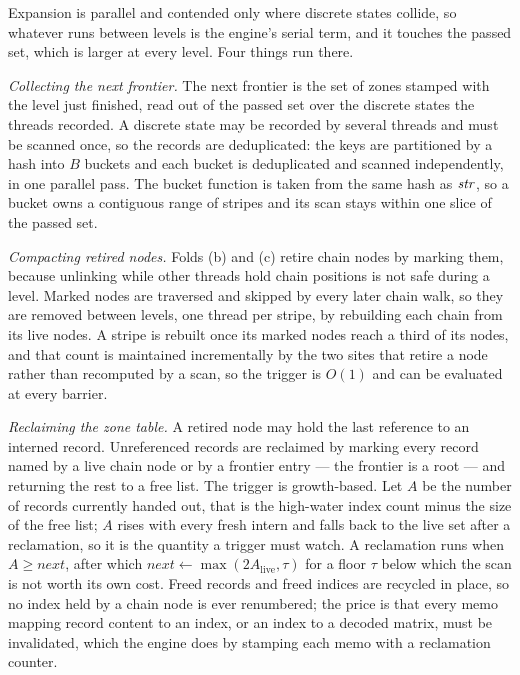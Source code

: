 Expansion is parallel and contended only where discrete states collide, so
whatever runs between levels is the engine's serial term, and it touches the
passed set, which is larger at every level.  Four things run there.

\emph{Collecting the next frontier.}  The next frontier is the set of zones
stamped with the level just finished, read out of the passed set over the
discrete states the threads recorded.  A discrete state may be recorded by
several threads and must be scanned once, so the records are deduplicated: the
keys are partitioned by a hash into $B$ buckets and each bucket is deduplicated
and scanned independently, in one parallel pass.  The bucket function is taken
from the same hash as $\mathit{str}$, so a bucket owns a contiguous range of stripes
and its scan stays within one slice of the passed set.

\emph{Compacting retired nodes.}  Folds (b) and (c) retire chain nodes by marking
them, because unlinking while other threads hold chain positions is not safe
during a level.  Marked nodes are traversed and skipped by every later chain walk,
so they are removed between levels, one thread per stripe, by rebuilding each
chain from its live nodes.  A stripe is rebuilt once its marked nodes reach a
third of its nodes, and that count is maintained incrementally by the two sites
that retire a node rather than recomputed by a scan, so the trigger is $O(1)$ and
can be evaluated at every barrier.

\emph{Reclaiming the zone table.}  A retired node may hold the last reference to
an interned record.  Unreferenced records are reclaimed by marking every record
named by a live chain node or by a frontier entry --- the frontier is a root ---
and returning the rest to a free list.  The trigger is growth-based.  Let $A$ be
the number of records currently handed out, that is the high-water index count
minus the size of the free list; $A$ rises with every fresh intern and falls back
to the live set after a reclamation, so it is the quantity a trigger must watch.
A reclamation runs when $A \ge \mathit{next}$, after which $\mathit{next}
\leftarrow \max(2A_{\mathrm{live}}, \tau)$ for a floor $\tau$ below which the
scan is not worth its own cost.  Freed records and freed indices are recycled in
place, so no index held by a chain node is ever renumbered; the price is that
every memo mapping record content to an index, or an index to a decoded matrix,
must be invalidated, which the engine does by stamping each memo with a
reclamation counter.

